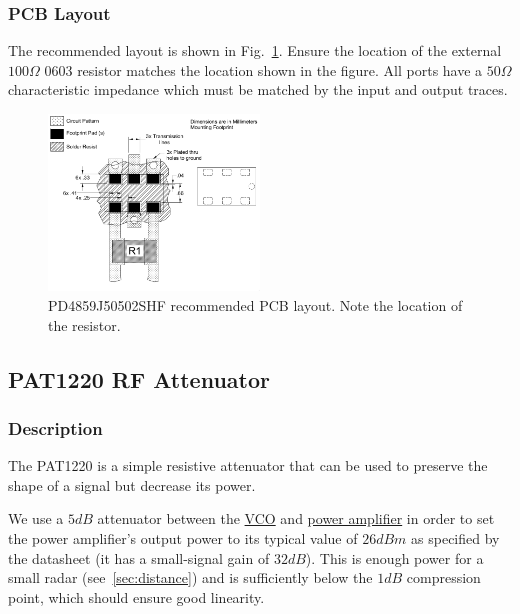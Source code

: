 \subsubsection{PCB Layout}
\label{sec:pd4859j50502shf-pcb}

The recommended layout is shown in Fig.~\ref{fig:pd4859j50502shf-pcb}. Ensure the location of the
external $100 \si{\Omega}$ 0603 resistor matches the location shown in the figure. All ports have a
$50 \si{\Omega}$ characteristic impedance which must be matched by the input and output traces.

\begin{figure}[h]
        \centering
        \includegraphics[width=0.5\textwidth]{data/pd4859j50502shf-pcb}
        \caption{PD4859J50502SHF recommended PCB layout. Note the location of the resistor.}
        \label{fig:pd4859j50502shf-pcb}
\end{figure}

\subsection{PAT1220 RF Attenuator}
\label{sec:pat1220}

\subsubsection{Description}
\label{sec:pat1220-description}

The PAT1220 is a simple resistive attenuator that can be used to preserve the shape of a signal but
decrease its power.

We use a $5 \si{dB}$ attenuator between the \hyperref[sec:hmc431lp4rf]{VCO} and
\hyperref[sec:se2567l]{power amplifier} in order to set the power amplifier's output power to its
typical value of $26 \si{dBm}$ as specified by the datasheet (it has a small-signal gain of
$32 \si{dB}$). This is enough power for a small radar (see~\cref{sec:distance}) and is sufficiently
below the $1 \si{dB}$ compression point, which should ensure good linearity.


